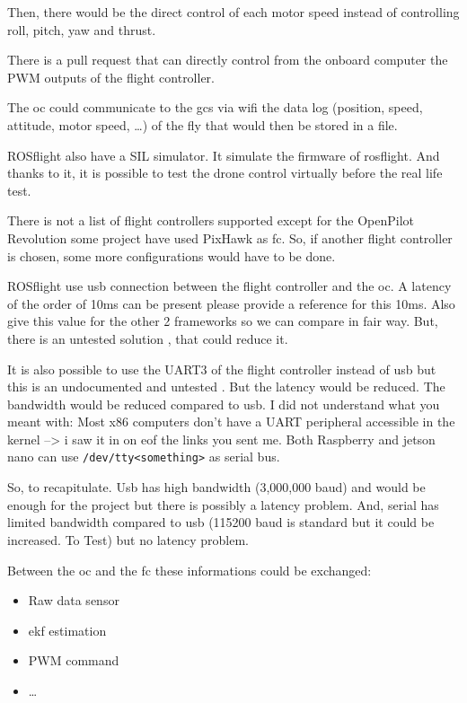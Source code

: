     Then, there would be the direct control of each motor speed instead of controlling roll, pitch, yaw and thrust.
    
    There is a pull request \cite{github_rosflight_98} that can directly control from the onboard computer the PWM outputs of the flight controller.
    
    The \gls{oc} could communicate to the \gls{gcs} via wifi the data log (position, speed, attitude, motor speed, …) of the fly that would then be stored in a file.
    
    ROSflight also have a SIL simulator. It simulate the firmware of rosflight. And thanks to it, it is possible to test the drone control virtually before the real life test.
    
    There is not a list of flight controllers supported except for the OpenPilot Revolution some project have used PixHawk as \gls{fc}.
    So, if another flight controller is chosen, some more configurations would have to be done.
    
    ROSflight use usb connection between the flight controller and the \gls{oc}. A latency of the order of 10ms can be present {\color{red} please provide a reference for this 10ms. Also give this value for the other 2 frameworks so we can compare in fair way}. But, there is an untested solution \cite{github_rosflight_98}, that could reduce it.
    
    It is also possible to use the UART3 of the flight controller instead of usb but this is an undocumented and untested \cite{github_rosflight_98}.
    But the latency would be reduced. The bandwidth would be reduced compared to usb.
    {\color{red} I did not understand what you meant with: Most x86 computers don't have a UART peripheral accessible in the kernel --> i saw it in on eof the links you sent me.}
    Both Raspberry and jetson nano can use \texttt{/dev/tty<something>} as serial bus.
    
    So, to recapitulate. Usb has high bandwidth (3,000,000 baud) and would be enough for the project \cite{github_rosflight_98} but there is possibly a latency problem.
    And, serial has limited bandwidth compared to usb (115200 baud is standard but it could be increased. To Test) but no latency problem.
    
    
    Between the \gls{oc} and the \gls{fc} these informations could be exchanged:
    \begin{itemize}
        \item Raw data sensor
        \item \gls{ekf} estimation
        \item PWM command
        \item …
    \end{itemize}
    
